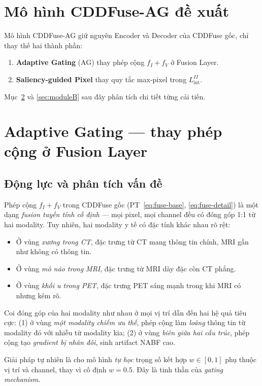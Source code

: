 \section{Mô hình CDDFuse-AG đề xuất}
\label{sec:cddfuse-ag}

Mô hình CDDFuse-AG giữ nguyên Encoder và Decoder của CDDFuse gốc, chỉ thay thế hai thành phần:
\begin{enumerate}\itemsep0pt
    \item \textbf{Adaptive Gating} (AG) thay phép cộng $f_I + f_V$ ở Fusion Layer.
    \item \textbf{Saliency-guided Pixel} thay quy tắc max-pixel trong $L_{\mathrm{int}}^{II}$.
\end{enumerate}
Mục~\ref{sec:moduleA} và \ref{sec:moduleB} sau đây phân tích chi tiết từng cải tiến.

\section{Adaptive Gating --- thay phép cộng ở Fusion Layer}
\label{sec:moduleA}

\subsection{Động lực và phân tích vấn đề}

Phép cộng $f_I + f_V$ trong CDDFuse gốc (PT~\ref{eq:fuse-base}, \ref{eq:fuse-detail}) là một dạng \emph{fusion tuyến tính cố định} --- mọi pixel, mọi channel đều có đóng góp 1:1 từ hai modality. Tuy nhiên, hai modality y tế có đặc tính khác nhau rõ rệt:
\begin{itemize}\itemsep0pt
    \item Ở vùng \emph{xương trong CT}, đặc trưng từ CT mang thông tin chính, MRI gần như không có thông tin.
    \item Ở vùng \emph{mô não trong MRI}, đặc trưng từ MRI dày đặc còn CT phẳng.
    \item Ở vùng \emph{khối u trong PET}, đặc trưng PET sáng mạnh trong khi MRI có nhưng kém rõ.
\end{itemize}
Coi đóng góp của hai modality như nhau ở mọi vị trí dẫn đến hai hệ quả tiêu cực: (1) ở vùng \emph{một modality chiếm ưu thế}, phép cộng làm \emph{loãng} thông tin từ modality đó với nhiễu từ modality kia; (2) ở vùng \emph{biên giữa hai cấu trúc}, phép cộng tạo \emph{gradient bị nhân đôi}, sinh artifact NABF cao.

Giải pháp tự nhiên là cho mô hình \emph{tự học} trọng số kết hợp $w \in [0, 1]$ phụ thuộc vị trí và channel, thay vì cố định $w = 0.5$. Đây là tinh thần của \emph{gating mechanism}.

